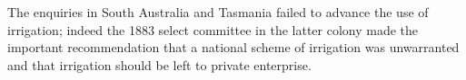 The enquiries in South Australia and Tasmania failed to advance the
use of irrigation; indeed the 1883 select committee in the latter
colony made the important recommendation that a national scheme of
irrigation was unwarranted and that irrigation should be left to
private enterprise.

